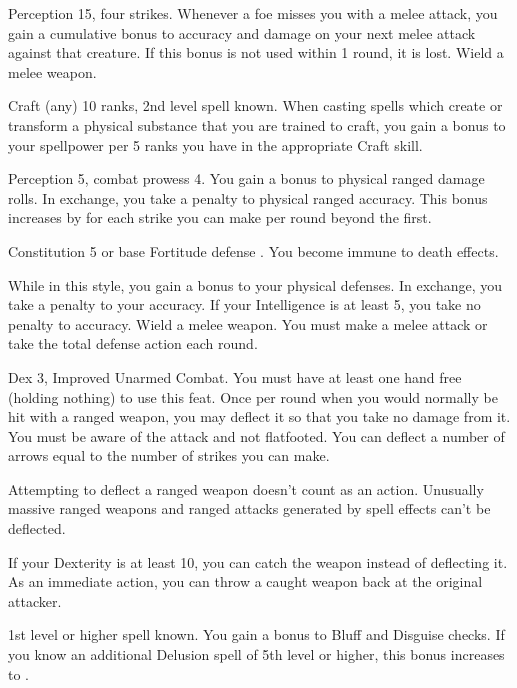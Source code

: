 \featpres Perception 15, four strikes.
\featben Whenever a foe misses you with a melee attack, you gain a cumulative  bonus to accuracy and damage on your next melee attack against that creature.
If this bonus is not used within 1 round, it is lost.
\stylereq Wield a melee weapon.

\featpres Craft (any) 10 ranks, 2nd level spell known.
\featben When casting spells which create or transform a physical substance that you are trained to craft, you gain a  bonus to your spellpower per 5 ranks you have in the appropriate Craft skill.

\featpres Perception 5, combat prowess 4.
\featben You gain a  bonus to physical ranged damage rolls.
In exchange, you take a  penalty to physical ranged accuracy.
This bonus increases by  for each strike you can make per round beyond the first.

\featpre Constitution 5 or base Fortitude defense .
\featben You become immune to death effects.

\featben While in this style, you gain a  bonus to your physical defenses.
In exchange, you take a  penalty to your accuracy.
If your Intelligence is at least 5, you take no penalty to accuracy.
\stylereq Wield a melee weapon. You must make a melee attack or take the total defense action each round.

\featpres Dex 3, Improved Unarmed Combat.
\featben You must have at least one hand free (holding nothing) to use this feat.
Once per round when you would normally be hit with a ranged weapon, you may deflect it so that you take no damage from it.
You must be aware of the attack and not flatfooted.
You can deflect a number of arrows equal to the number of strikes you can make.
\par Attempting to deflect a ranged weapon doesn't count as an action.
Unusually massive ranged weapons and ranged attacks generated by spell effects can't be deflected.
\par If your Dexterity is at least 10, you can catch the weapon instead of deflecting it.
As an immediate action, you can throw a caught weapon back at the original attacker.

\featpre 1st level or higher  spell known.
\featben You gain a  bonus to Bluff and Disguise checks.
If you know an additional Delusion spell of 5th level or higher, this bonus increases to .

